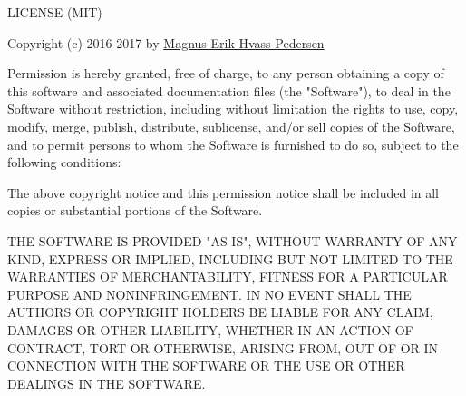 \documentclass[11pt]{article}
\begin{document}
    \hypertarget{Summary}{}
LICENSE (MIT)

Copyright (c) 2016-2017 by \href{http://www.hvass-labs.org/}{Magnus Erik
Hvass Pedersen}

Permission is hereby granted, free of charge, to any person obtaining a
copy of this software and associated documentation files (the
"Software"), to deal in the Software without restriction, including
without limitation the rights to use, copy, modify, merge, publish,
distribute, sublicense, and/or sell copies of the Software, and to
permit persons to whom the Software is furnished to do so, subject to
the following conditions:

The above copyright notice and this permission notice shall be included
in all copies or substantial portions of the Software.

THE SOFTWARE IS PROVIDED "AS IS", WITHOUT WARRANTY OF ANY KIND, EXPRESS
OR IMPLIED, INCLUDING BUT NOT LIMITED TO THE WARRANTIES OF
MERCHANTABILITY, FITNESS FOR A PARTICULAR PURPOSE AND NONINFRINGEMENT.
IN NO EVENT SHALL THE AUTHORS OR COPYRIGHT HOLDERS BE LIABLE FOR ANY
CLAIM, DAMAGES OR OTHER LIABILITY, WHETHER IN AN ACTION OF CONTRACT,
TORT OR OTHERWISE, ARISING FROM, OUT OF OR IN CONNECTION WITH THE
SOFTWARE OR THE USE OR OTHER DEALINGS IN THE SOFTWARE.


    
    
    
    
\end{document}
